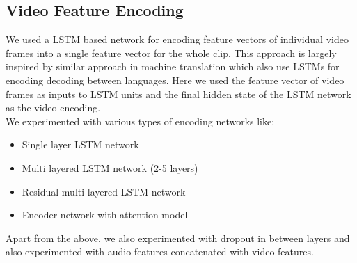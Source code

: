 \documentclass[12pt]{article}
\begin{document}
\subsection{Video Feature Encoding}
	We used a LSTM based network for encoding feature vectors of individual video frames into a single feature vector for the whole clip. This approach is largely inspired by similar approach in machine translation which also use LSTMs for encoding decoding between languages. Here we used the feature
	vector of video frames as inputs to LSTM units and the final hidden state of the LSTM network as the video encoding.\\ 
	We experimented with various types of encoding networks like:
	\begin{itemize}
		\item Single layer LSTM network
		\item Multi layered LSTM network (2-5 layers)
		\item Residual multi layered LSTM network
		\item Encoder network with attention model
	\end{itemize}
	Apart from the above, we also experimented with dropout in between layers and also experimented with audio features concatenated with
	video features.
\end{document}
